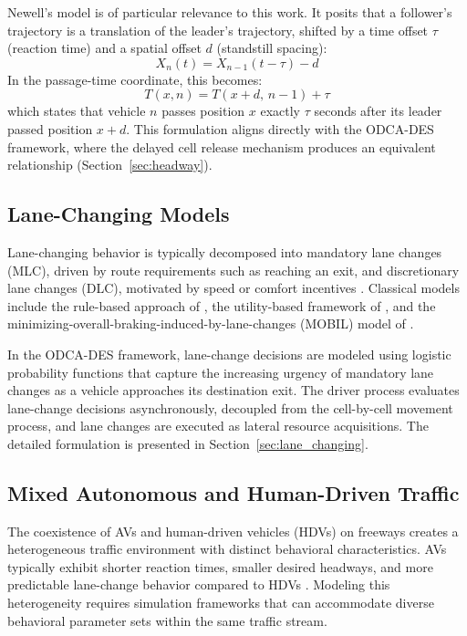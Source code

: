 \documentclass[review,authoryear]{elsarticle}
\begin{document}
Newell's model is of particular relevance to this work. It posits that a follower's trajectory is a translation of the leader's trajectory, shifted by a time offset $\tau$ (reaction time) and a spatial offset $d$ (standstill spacing):
\begin{equation}
    X_{n}(t) = X_{n-1}(t - \tau) - d
    \label{eq:newell_cf}
\end{equation}
In the passage-time coordinate, this becomes:
\begin{equation}
    T(x, n) = T(x + d,\, n-1) + \tau
    \label{eq:newell_cf_Txn}
\end{equation}
which states that vehicle $n$ passes position $x$ exactly $\tau$ seconds after its leader passed position $x + d$. This formulation aligns directly with the ODCA-DES framework, where the delayed cell release mechanism produces an equivalent relationship (Section~\ref{sec:headway}).

\subsection{Lane-Changing Models}
\label{sec:lit_lc}

Lane-changing behavior is typically decomposed into mandatory lane changes (MLC), driven by route requirements such as reaching an exit, and discretionary lane changes (DLC), motivated by speed or comfort incentives \citep{zheng2014recent}. Classical models include the rule-based approach of \citet{gipps1986model}, the utility-based framework of \citet{toledo2003modeling}, and the minimizing-overall-braking-induced-by-lane-changes (MOBIL) model of \citet{kesting2007general}.

In the ODCA-DES framework, lane-change decisions are modeled using logistic probability functions that capture the increasing urgency of mandatory lane changes as a vehicle approaches its destination exit. The driver process evaluates lane-change decisions asynchronously, decoupled from the cell-by-cell movement process, and lane changes are executed as lateral resource acquisitions. The detailed formulation is presented in Section~\ref{sec:lane_changing}.

\subsection{Mixed Autonomous and Human-Driven Traffic}
\label{sec:lit_mixed}

The coexistence of AVs and human-driven vehicles (HDVs) on freeways creates a heterogeneous traffic environment with distinct behavioral characteristics. AVs typically exhibit shorter reaction times, smaller desired headways, and more predictable lane-change behavior compared to HDVs \citep{talebpour2016influence, shladover2012impacts, vanarem2006effects}. Modeling this heterogeneity requires simulation frameworks that can accommodate diverse behavioral parameter sets within the same traffic stream.
\end{document}
